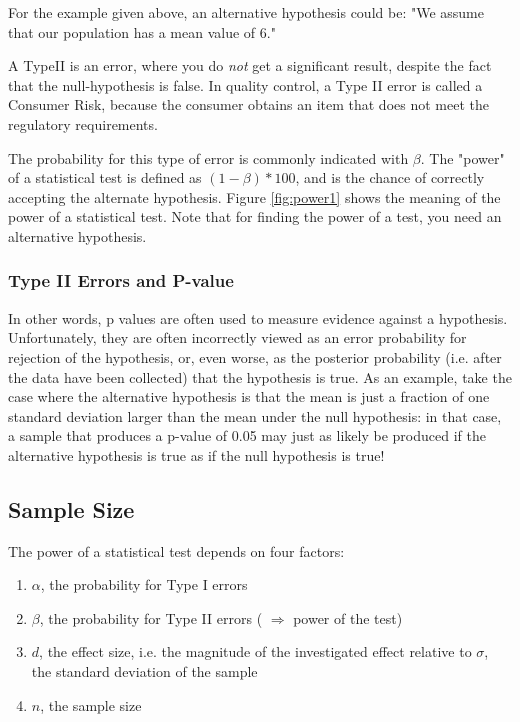 For the example given above, an alternative hypothesis could be: "We assume that our population has a mean value of 6."

A \gls{TypeII} is an error, where you do \emph{not} get a significant result, despite the fact that the null-hypothesis is false.  In quality control, a Type II error is called a Consumer Risk, because the consumer obtains an item that does not meet the regulatory requirements.

The probability for this type of error is commonly indicated with $\beta$. The "power" of a statistical test is defined as $(1-\beta)*100$, and is the chance of correctly accepting the alternate hypothesis. Figure \ref{fig:power1} shows the meaning of the power of a statistical test. Note that for finding the power of a test, you need an alternative hypothesis.

\subsubsection{Type II Errors and P-value}

In other words, p values are often used to measure evidence against a hypothesis. Unfortunately, they are often incorrectly viewed as an error probability for rejection of the hypothesis, or, even worse, as the posterior probability (i.e. after the data have been collected) that the hypothesis is true. As an example, take the case where the alternative hypothesis is that the mean is just a fraction of one standard deviation larger than the mean under the null hypothesis: in that case, a sample that produces a p-value of 0.05 may just as likely be produced if the alternative hypothesis is true as if the null hypothesis is true!

\subsection{Sample Size}
The power of a statistical test depends on four factors:

\begin{enumerate}
  \item  $\alpha$, the probability for Type I errors
  \item  $\beta$, the probability for Type II errors ( $\Rightarrow$ power of the test)
  \item  $d$, the effect size, i.e. the magnitude of the investigated effect relative to $\sigma$, the standard deviation of the sample
  \item  $n$, the sample size
\end{enumerate}

